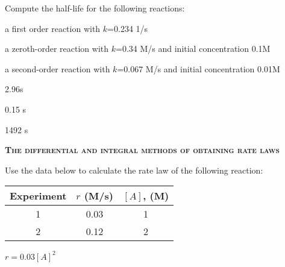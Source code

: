 \documentclass[main.tex]{subfiles}
\begin{document}
\begin{multicols*}{2}
\begin{question}[ID=\the\value{numA}]
Compute the half-life for the following reactions:
\begin{inparaenum}[(a)]
\item a first order reaction with $k$=0.234 1/s	 	%
\item a zeroth-order reaction with $k$=0.34 M/s	 and initial concentration 0.1M	%
\item a second-order reaction with $k$=0.067 M/s	 and initial concentration 0.01M	%
\end{inparaenum}
\end{question}
\begin{solution}
\begin{inparaenum}[(a)]
\item  2.96s 
\item  0.15 s
\item  1492 s
\end{inparaenum}\hspace{0.1cm}\end{solution}%




{\raggedright\textsc{\textbf{The differential and integral methods of obtaining rate laws }}\par}


\begin{question}[ID=\the\value{numA}]
Use the data below to calculate the rate law of the following reaction: \begin{center}\end{center}
\begin{center}\begin{tabular}[t]{  c c  c   }
\toprule
 Experiment &$r$ (M/s)	&$[A]$, (M) \\
\midrule
1&	0.03&	1\\
2&	0.12 &2	\\
\bottomrule
\end{tabular}\end{center}
\end{question}
\begin{solution}
$r=0.03[A]^2$
\hspace{0.1cm}\end{solution}%



\end{multicols*}
\end{document}
